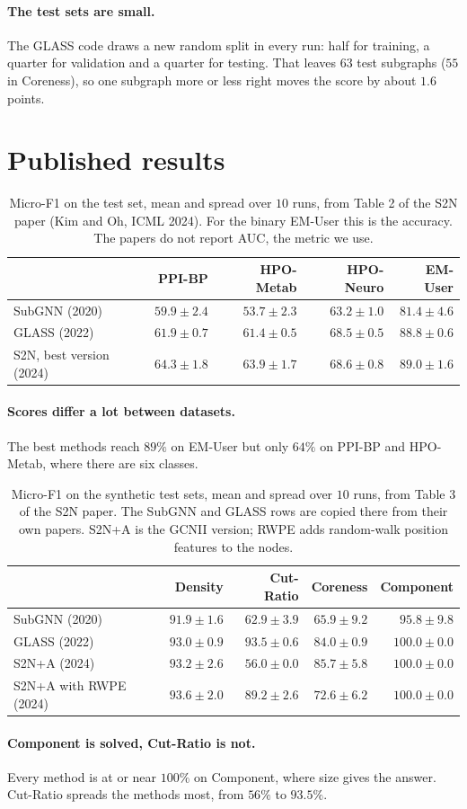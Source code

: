 \documentclass[11pt]{article}
\begin{document}
\paragraph{The test sets are small.} The GLASS code draws a new random split in every run:
half for training, a quarter for validation and a quarter for testing. That leaves $63$
test subgraphs ($55$ in Coreness), so one subgraph more or less right moves the score by
about $1.6$ points.

\section*{Published results}

\begin{table}[H]
\centering
\small
\begin{tabular}{lrrrr}
\toprule
 & PPI-BP & HPO-Metab & HPO-Neuro & EM-User \\
\midrule
SubGNN (2020) & $59.9 \pm 2.4$ & $53.7 \pm 2.3$ & $63.2 \pm 1.0$ & $81.4 \pm 4.6$ \\
GLASS (2022) & $61.9 \pm 0.7$ & $61.4 \pm 0.5$ & $68.5 \pm 0.5$ & $88.8 \pm 0.6$ \\
S2N, best version (2024) & $64.3 \pm 1.8$ & $63.9 \pm 1.7$ & $68.6 \pm 0.8$ & $89.0 \pm 1.6$ \\
\bottomrule
\end{tabular}
\caption{Micro-F1 on the test set, mean and spread over $10$ runs, from Table 2 of the S2N
paper (Kim and Oh, ICML 2024). For the binary EM-User this is the accuracy. The papers do not
report AUC, the metric we use.}
\end{table}

\paragraph{Scores differ a lot between datasets.} The best methods reach $89\%$ on EM-User
but only $64\%$ on PPI-BP and HPO-Metab, where there are six classes.

\begin{table}[H]
\centering
\small
\begin{tabular}{lrrrr}
\toprule
 & Density & Cut-Ratio & Coreness & Component \\
\midrule
SubGNN (2020) & $91.9 \pm 1.6$ & $62.9 \pm 3.9$ & $65.9 \pm 9.2$ & $95.8 \pm 9.8$ \\
GLASS (2022) & $93.0 \pm 0.9$ & $93.5 \pm 0.6$ & $84.0 \pm 0.9$ & $100.0 \pm 0.0$ \\
S2N+A (2024) & $93.2 \pm 2.6$ & $56.0 \pm 0.0$ & $85.7 \pm 5.8$ & $100.0 \pm 0.0$ \\
S2N+A with RWPE (2024) & $93.6 \pm 2.0$ & $89.2 \pm 2.6$ & $72.6 \pm 6.2$ & $100.0 \pm 0.0$ \\
\bottomrule
\end{tabular}
\caption{Micro-F1 on the synthetic test sets, mean and spread over $10$ runs, from Table 3
of the S2N paper. The SubGNN and GLASS rows are copied there from their own papers. S2N+A
is the GCNII version; RWPE adds random-walk position features to the nodes.}
\end{table}

\paragraph{Component is solved, Cut-Ratio is not.} Every method is at or near $100\%$ on
Component, where size gives the answer. Cut-Ratio spreads the methods most, from $56\%$ to
$93.5\%$.
\end{document}

